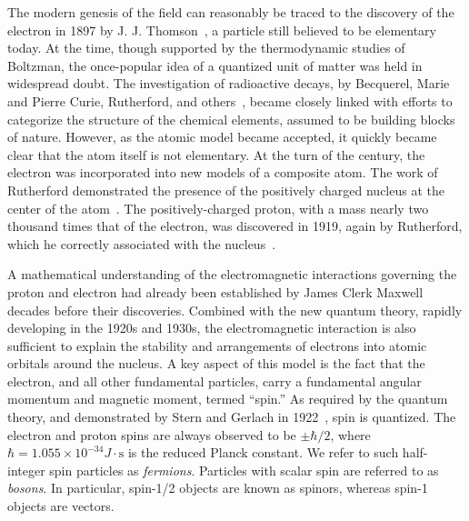 The modern genesis of the field can reasonably be traced to 
the discovery of the electron in 1897 by J. J. Thomson~\cite{doi:10.1080/14786449708621070}, a particle still
believed to be elementary today.
At the time, though supported by the thermodynamic studies of Boltzman,
the once-popular idea of a quantized unit of matter was
held in widespread doubt. 
The investigation of radioactive decays, by Becquerel,
Marie and Pierre Curie, Rutherford, and others~\cite{RADVANYI2017544}, 
became closely linked with efforts to categorize
the structure of the chemical elements, assumed to be
building blocks of nature. 
However, as the atomic model became accepted, 
it quickly became clear that the atom itself is not elementary.
At the turn of the century, the electron was incorporated into 
new models of a composite atom.
The work of Rutherford demonstrated the presence of the
positively charged nucleus at the center of the atom~\cite{Rutherford:1911zz}.
The positively-charged proton, with a mass nearly two thousand times
that of the electron, was discovered in 1919, again by Rutherford,
which he correctly associated with the 
nucleus~\cite{doi:10.1080/14786440608635919}.

A mathematical understanding of the electromagnetic interactions 
governing the proton and electron had
already been established by James Clerk Maxwell decades before their discoveries.
Combined with the new quantum theory, rapidly developing in the 1920s and 1930s, the electromagnetic
interaction is also sufficient to explain the stability and arrangements of
electrons into atomic orbitals around the nucleus. 
A key aspect of this model is the fact that the electron, and all other
fundamental particles, carry a fundamental
angular momentum and magnetic moment, termed ``spin.'' 
As required by the quantum theory, and 
demonstrated by Stern and Gerlach in 1922~\cite{1922ZPhy....9..349G},
spin is quantized.
The electron and proton spins are always observed to be $\pm\hbar/2$, where 
$\hbar=1.055\times 10^{-34}\unit{J}\cdot\mathrm{s}$
is the reduced Planck constant.
We refer to such half-integer spin particles as \emph{fermions}. Particles
with scalar spin are referred to as \emph{bosons}. In particular, spin-1/2 objects
are known as spinors, whereas spin-1 objects are vectors.

